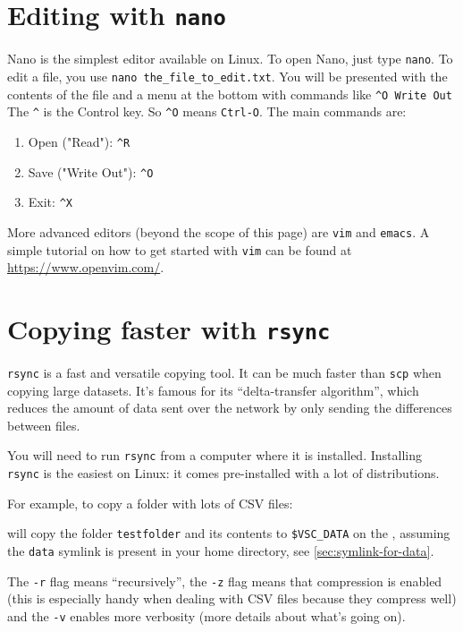 \section{Editing with \texttt{nano}}

Nano is the simplest editor available on Linux. To open Nano, just type
\verb|nano|. To edit a file, you use \verb|nano the_file_to_edit.txt|. You will
be presented with the contents of the file and a menu at the bottom with
commands like \verb|^O Write Out| The \verb|^| is the Control key. So \verb|^O| means
\verb|Ctrl-O|. The main commands are:

\begin{enumerate}
\item Open ("Read"): \verb|^R|
\item Save ("Write Out"): \verb|^O|
\item Exit: \verb|^X|
\end{enumerate}

More advanced editors (beyond the scope of this page) are \verb|vim| and \verb|emacs|.
A simple tutorial on how to get started with \verb|vim| can be found at \url{https://www.openvim.com/}.

\section{Copying faster with \texttt{rsync}}
\hypertarget{sec:rsync}{}

\verb|rsync| is a fast and versatile copying tool. It can be much faster than \verb|scp|
when copying large datasets. It's famous for its ``delta-transfer algorithm'', which
reduces the amount of data sent over the network by only sending the differences between
files.

You will need to run \verb|rsync| from a computer where it is installed. Installing
\verb|rsync| is the easiest on Linux: it comes pre-installed with a lot of distributions.

For example, to copy a folder with lots of CSV files:

\begin{prompt}
\end{prompt}

will copy the folder \verb|testfolder| and its contents to \verb|$VSC_DATA| on
the \hpc, assuming the \verb|data| symlink is present in your home directory,
see \autoref{sec:symlink-for-data}.

The \verb|-r| flag means ``recursively'', the \verb|-z| flag means that compression
is enabled (this is especially handy when dealing with CSV files because they compress well) and the \verb|-v|
enables more verbosity (more details about what's going on).


